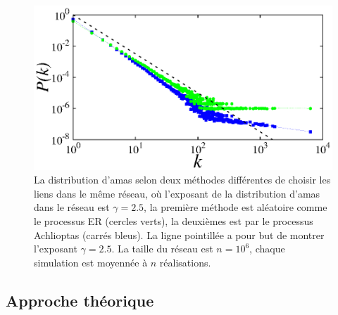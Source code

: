  \begin{figure}[h!]
 	\centering
 	\includegraphics[scale=1.2]{./figures/fig-gama}
 	\caption{La distribution d'amas selon deux méthodes différentes de choisir les liens dans le même réseau, où l'exposant de la distribution d'amas dans le réseau est $\gamma=2.5$, la première méthode est aléatoire comme le processus ER (cercles verts), la deuxièmes est par le processus Achlioptas \cite{Achlioptas-al2009} (carrés bleus). La ligne pointillée a pour but de montrer  l'exposant  $\gamma=2.5$. La taille du réseau est $n=10^6$, chaque simulation est moyennée à $n$ réalisations. }
 	\label{gama-5}
 \end{figure}
 
\subsection{Approche théorique}
